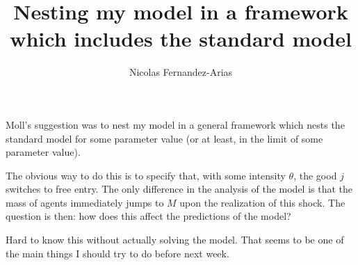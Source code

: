 \documentclass[12pt,english]{article}
\theoremstyle{remark}
\begin{document}
\title{Nesting my model in a framework which includes the standard model}
\author{Nicolas Fernandez-Arias}
\maketitle

Moll's suggestion was to nest my model in a general framework which nests the standard model for some parameter value (or at least, in the limit of some parameter value).

The obvious way to do this is to specify that, with some intensity $\theta$, the good $j$ switches to free entry. The only difference in the analysis of the model is that the mass of agents immediately jumps to $M$ upon the realization of this shock. The question is then: how does this affect the predictions of the model?

Hard to know this without actually solving the model. That seems to be one of the main things I should try to do before next week.
\end{document}
